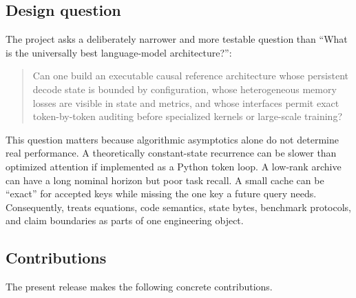 \subsection{Design question}

The project asks a deliberately narrower and more testable question than
``What is the universally best language-model architecture?'':

\begin{quote}
Can one build an executable causal reference architecture whose persistent
decode state is bounded by configuration, whose heterogeneous memory losses
are visible in state and metrics, and whose interfaces permit exact
token-by-token auditing before specialized kernels or large-scale training?
\end{quote}

This question matters because algorithmic asymptotics alone do not determine
real performance. A theoretically constant-state recurrence can be slower than
optimized attention if implemented as a Python token loop. A low-rank archive
can have a long nominal horizon but poor task recall. A small cache can be
``exact'' for accepted keys while missing the one key a future query needs.
Consequently, \ALUCLU treats equations, code semantics, state bytes, benchmark
protocols, and claim boundaries as parts of one engineering object.

\subsection{Contributions}

The present release makes the following concrete contributions.

